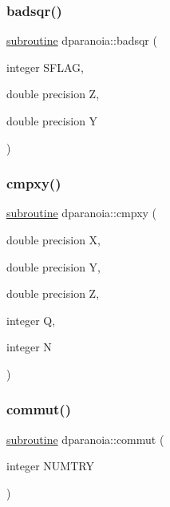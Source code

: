 \mbox{\label{dparanoia_8f90_a1eaee4863c898f69a37338f52cc223d2}} 
\subsubsection{\texorpdfstring{badsqr()}{badsqr()}}
{\footnotesize\ttfamily \hyperlink{M__stopwatch_83_8txt_acfbcff50169d691ff02d4a123ed70482}{subroutine} dparanoia\+::badsqr (\begin{DoxyParamCaption}\item[{integer}]{S\+F\+L\+AG,  }\item[{double precision}]{Z,  }\item[{double precision}]{Y }\end{DoxyParamCaption})}

\mbox{\label{dparanoia_8f90_a143ab8d599568d2afcca2aa81370b990}} 
\subsubsection{\texorpdfstring{cmpxy()}{cmpxy()}}
{\footnotesize\ttfamily \hyperlink{M__stopwatch_83_8txt_acfbcff50169d691ff02d4a123ed70482}{subroutine} dparanoia\+::cmpxy (\begin{DoxyParamCaption}\item[{double precision}]{X,  }\item[{double precision}]{Y,  }\item[{double precision}]{Z,  }\item[{integer}]{Q,  }\item[{integer}]{N }\end{DoxyParamCaption})}

\mbox{\label{dparanoia_8f90_ae7890d0a663dc609947497ee29d7b921}} 
\subsubsection{\texorpdfstring{commut()}{commut()}}
{\footnotesize\ttfamily \hyperlink{M__stopwatch_83_8txt_acfbcff50169d691ff02d4a123ed70482}{subroutine} dparanoia\+::commut (\begin{DoxyParamCaption}\item[{integer}]{N\+U\+M\+T\+RY }\end{DoxyParamCaption})}



